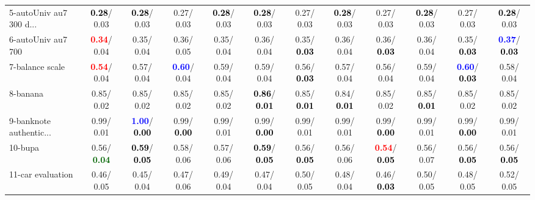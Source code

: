 \begin{table}[h]
\begin{center}
{\begin{tabular}{lc|c|c|c|c|c|c|c|c|c|c}
5-autoUniv au7 300 d... & \textcolor{black}{\textbf{  0.28}}/  0.03 & \textcolor{black}{\textbf{  0.28}}/  0.03 &   0.27/  0.03 & \textcolor{black}{\textbf{  0.28}}/  0.03 & \textcolor{black}{\textbf{  0.28}}/  0.03 &   0.27/  0.03 & \textcolor{black}{\textbf{  0.28}}/  0.03 &   0.27/  0.03 & \textcolor{black}{\textbf{  0.28}}/  0.03 &   0.27/  0.03 & \textcolor{black}{\textbf{  0.28}}/  0.03 \\
6-autoUniv au7 700 & \textcolor{red}{\textbf{  0.34}}/  0.04 &   0.35/  0.04 &   0.36/  0.05 &   0.35/  0.04 &   0.36/  0.04 &   0.35/\textcolor{black}{\textbf{  0.03}} &   0.36/  0.04 &   0.36/\textcolor{black}{\textbf{  0.03}} &   0.36/  0.04 &   0.35/\textcolor{black}{\textbf{  0.03}} & \textcolor{blue}{\textbf{  0.37}}/\textcolor{black}{\textbf{  0.03}} \\
7-balance scale & \textcolor{red}{\textbf{  0.54}}/  0.04 &   0.57/  0.04 & \textcolor{blue}{\textbf{  0.60}}/  0.04 &   0.59/  0.04 &   0.59/  0.04 &   0.56/\textcolor{black}{\textbf{  0.03}} &   0.57/  0.04 &   0.56/  0.04 &   0.59/  0.04 & \textcolor{blue}{\textbf{  0.60}}/\textcolor{black}{\textbf{  0.03}} &   0.58/  0.04 \\ \hline
8-banana &   0.85/  0.02 &   0.85/  0.02 &   0.85/  0.02 &   0.85/  0.02 & \textcolor{black}{\textbf{  0.86}}/\textcolor{black}{\textbf{  0.01}} &   0.85/\textcolor{black}{\textbf{  0.01}} &   0.84/\textcolor{black}{\textbf{  0.01}} &   0.85/  0.02 &   0.85/\textcolor{black}{\textbf{  0.01}} &   0.85/  0.02 &   0.85/  0.02 \\
9-banknote authentic... &   0.99/  0.01 & \textcolor{blue}{\textbf{  1.00}}/\textcolor{black}{\textbf{  0.00}} &   0.99/\textcolor{black}{\textbf{  0.00}} &   0.99/  0.01 &   0.99/\textcolor{black}{\textbf{  0.00}} &   0.99/  0.01 &   0.99/  0.01 &   0.99/\textcolor{black}{\textbf{  0.00}} &   0.99/  0.01 &   0.99/\textcolor{black}{\textbf{  0.00}} &   0.99/  0.01 \\
10-bupa &   0.56/\textcolor{darkgreen}{\textbf{  0.04}} & \textcolor{black}{\textbf{  0.59}}/\textcolor{black}{\textbf{  0.05}} &   0.58/  0.06 &   0.57/  0.06 & \textcolor{black}{\textbf{  0.59}}/\textcolor{black}{\textbf{  0.05}} &   0.56/\textcolor{black}{\textbf{  0.05}} &   0.56/  0.06 & \textcolor{red}{\textbf{  0.54}}/\textcolor{black}{\textbf{  0.05}} &   0.56/  0.07 &   0.56/\textcolor{black}{\textbf{  0.05}} &   0.56/\textcolor{black}{\textbf{  0.05}} \\
11-car evaluation &   0.46/  0.05 &   0.45/  0.04 &   0.47/  0.06 &   0.49/  0.04 &   0.47/  0.04 &   0.50/  0.05 &   0.48/  0.04 &   0.46/\textcolor{black}{\textbf{  0.03}} &   0.50/  0.05 &   0.48/  0.05 &   0.52/  0.05 \\

\end{tabular}}
\end{center}
\end{table}
